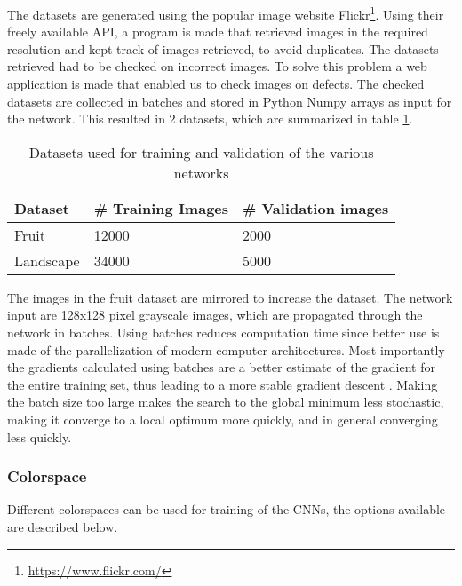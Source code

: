 The datasets are generated using the popular image website Flickr\footnote{\url{https://www.flickr.com/}}.
Using their freely available API, a program is made that retrieved images in the required resolution and kept track of images retrieved, to avoid duplicates. The datasets retrieved had to be checked on incorrect images. To solve this problem a web application is made that enabled us to check images on defects. The checked datasets are collected in batches and stored in Python Numpy arrays as input for the network.
This resulted in 2 datasets, which are summarized in table \ref{tab:dataset}.

\begin{table}[h!]
	\centering
	\caption{Datasets used for training and validation of the various networks}
	\label{tab:dataset}
	\begin{tabular}{|l|l|l|}
		\hline
		\textbf{Dataset}   & \textbf{\# Training Images} & \textbf{\# Validation images} \\ \hline \hline
		Fruit\footnote     & 12000            & 2000              \\ \hline
		Landscape & 34000           & 5000              \\ \hline
	\end{tabular}
\end{table}


The images in the fruit dataset are mirrored to increase the dataset. The network input are 128x128 pixel grayscale images, which are propagated through the network in batches. Using batches reduces computation time since better use is made of the parallelization of modern computer architectures. Most importantly the gradients calculated using batches are a better estimate of the gradient for the entire training set, thus leading to a more stable gradient descent \cite{ioffe2015batch}. Making the batch size too large makes the search to the global minimum less stochastic, making it converge to a local optimum more quickly, and in general converging less quickly. \\

\subsubsection{Colorspace}
Different colorspaces can be used for training of the CNNs, the options available are described below.\\


